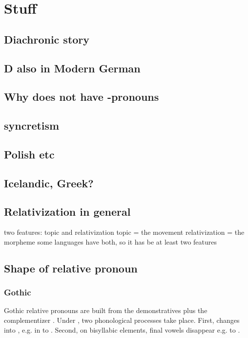 
\chapter{Stuff}

\section{Diachronic story}

\section{D also in Modern German}

\section{Why  does not have -pronouns}

\section{syncretism}

\section{Polish etc}

\section{Icelandic, Greek?}


\section{Relativization in general}

two features: topic and relativization
topic = the movement
relativization = the morpheme
some languages have both, so it has be at least two features


\section{Shape of relative pronoun}

\subsection{Gothic}

Gothic relative pronouns are built from the demonstratives plus the complementizer . Under , two phonological processes take place. First,  changes into , e.g. in  to . Second, on bisyllabic elements, final vowels disappear e.g.  to .

